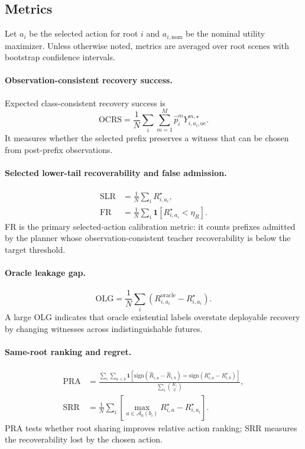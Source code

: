 \documentclass[conference]{IEEEtran}
\begin{document}
\subsection{Metrics}
\label{subsec:metrics}

Let $a_i$ be the selected action for root $i$ and $a_{i,\mathrm{nom}}$ be the nominal utility maximizer.  Unless otherwise noted, metrics are averaged over root scenes with bootstrap confidence intervals.

\paragraph{Observation-consistent recovery success.}
Expected class-consistent recovery success is
\begin{equation}
\label{eq:metric_ocrs}
    \mathrm{OCRS}=\frac{1}{N}\sum_i\sum_{m=1}^{M}\hat p_i^m
    Y_{i,a_i,\mathrm{oc}}^{m,\star}.
\end{equation}
It measures whether the selected prefix preserves a witness that can be chosen from post-prefix observations.

\paragraph{Selected lower-tail recoverability and false admission.}
\begin{align}
\label{eq:metric_slr}
    \mathrm{SLR}&=\frac{1}{N}\sum_i R_{i,a_i}^{\star},\\
\label{eq:metric_fr}
    \mathrm{FR}&=\frac{1}{N}\sum_i \mathbf 1[R_{i,a_i}^{\star}<\eta_R].
\end{align}
FR is the primary selected-action calibration metric: it counts prefixes admitted by the planner whose observation-consistent teacher recoverability is below the target threshold.

\paragraph{Oracle leakage gap.}
\begin{equation}
\label{eq:metric_olg}
    \mathrm{OLG}=\frac{1}{N}\sum_i
    \left(R_{i,a_i}^{\mathrm{oracle}}-R_{i,a_i}^{\star}\right).
\end{equation}
A large OLG indicates that oracle existential labels overstate deployable recovery by changing witnesses across indistinguishable futures.

\paragraph{Same-root ranking and regret.}
\begin{align}
\label{eq:metric_pra}
    \mathrm{PRA}&=
    \frac{\sum_i\sum_{a<b}\mathbf 1[\mathrm{sign}(\hat R_{i,a}-\hat R_{i,b})=\mathrm{sign}(R_{i,a}^{\star}-R_{i,b}^{\star})]}
    {\sum_i {K_i\choose2}},\\
\label{eq:metric_srr}
    \mathrm{SRR}&=\frac{1}{N}\sum_i
    \left[\max_{a\in\mathcal A_0(b_i)}R_{i,a}^{\star}-R_{i,a_i}^{\star}\right].
\end{align}
PRA tests whether root sharing improves relative action ranking; SRR measures the recoverability lost by the chosen action.
\end{document}
